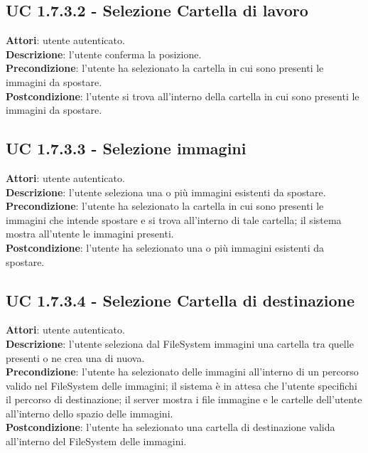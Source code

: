 		\subsection{UC 1.7.3.2 - Selezione Cartella di lavoro}{
			\label{uc1.7.3.2}
			\textbf{Attori}: utente autenticato. \\
			\textbf{Descrizione}: l'utente conferma la posizione. \\
			\textbf{Precondizione}: l'utente ha selezionato la cartella in cui sono presenti le immagini da spostare.	\\
			\textbf{Postcondizione}: l'utente si trova all'interno della cartella in cui sono presenti le immagini da spostare. 	\\
			}
		\subsection{UC 1.7.3.3 - Selezione immagini}{
			\label{uc1.7.3.3}
			\textbf{Attori}: utente autenticato. \\
			\textbf{Descrizione}: l'utente seleziona una o più immagini esistenti da spostare. \\
			\textbf{Precondizione}: l'utente ha selezionato la cartella in cui sono presenti le immagini che intende spostare e si trova all'interno di tale cartella; il sistema mostra all'utente le immagini presenti.	\\
			\textbf{Postcondizione}: l'utente ha selezionato una o più immagini esistenti da spostare.	\\
			}
		\subsection{UC 1.7.3.4 - Selezione Cartella di destinazione}{
			\label{uc1.7.3.4}
			\textbf{Attori}: utente autenticato. \\
			\textbf{Descrizione}: l'utente seleziona dal FileSystem immagini una cartella tra quelle presenti o ne crea una di nuova. \\
			\textbf{Precondizione}: l'utente ha selezionato delle immagini all'interno di un percorso valido nel FileSystem delle immagini; il sistema è in attesa che l'utente specifichi il percorso di destinazione; il server mostra i file immagine e le cartelle dell'utente all'interno dello spazio delle immagini.	\\
			\textbf{Postcondizione}: l'utente ha selezionato una cartella di destinazione valida all'interno del FileSystem delle immagini.	\\
			}
